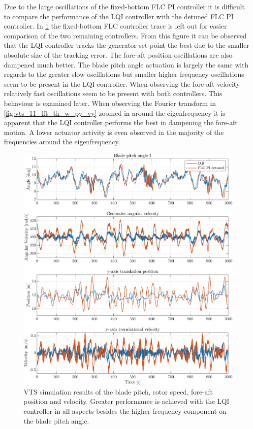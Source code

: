Due to the large oscillations of the fixed-bottom FLC PI controller it is difficult to compare the performance of the LQI controller with the detuned FLC PI controller. In \cref{fig:vts_10_th_w_py_vy} the fixed-bottom FLC controller trace is left out for easier comparison of the two remaining controllers. From this figure it can be observed that the LQI controller tracks the generator set-point the best due to the smaller absolute size of the tracking error. The fore-aft position oscillations are also dampened much better. The blade pitch angle actuation is largely the same with regards to the greater slow oscillations but smaller higher frequency oscillations seem to be present in the LQI controller. When observing the fore-aft velocity relatively fast oscillations seem to be present with both controllers. This behaviour is examined later. When observing the Fourier transform in \cref{fig:vts_11_fft_th_w_py_vy} zoomed in around the eigenfrequency it is apparent that the LQI controller performs the best in dampening the fore-aft motion. A lower actuator activity is even observed in the majority of the frequencies around the eigenfrequency.
\begin{figure}[h]
	\centering
	\includegraphics[width=0.7\linewidth]{Graphics/TestResults/VTSplotting/10_th_w_py_vy.png}
	\caption{VTS simulation results of the blade pitch, rotor speed, fore-aft position and velocity. Greater performance is achieved with the LQI controller in all aspects besides the higher frequency component on the blade pitch angle.}
	\label{fig:vts_10_th_w_py_vy}
\end{figure}

